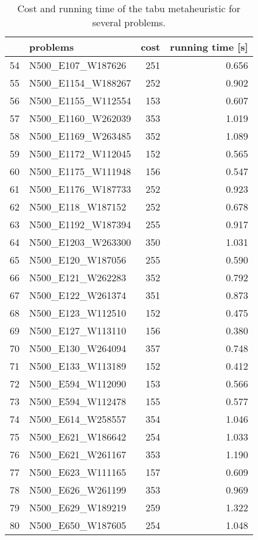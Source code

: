 \begin{table}[H]
\centering
\begin{tabular}{llrr}
\toprule
{} &            problems &  cost &  running time [s] \\
\midrule
54 &   N500\_E107\_W187626 &   251 &             0.656 \\
55 &  N500\_E1154\_W188267 &   252 &             0.902 \\
56 &  N500\_E1155\_W112554 &   153 &             0.607 \\
57 &  N500\_E1160\_W262039 &   353 &             1.019 \\
58 &  N500\_E1169\_W263485 &   352 &             1.089 \\
59 &  N500\_E1172\_W112045 &   152 &             0.565 \\
60 &  N500\_E1175\_W111948 &   156 &             0.547 \\
61 &  N500\_E1176\_W187733 &   252 &             0.923 \\
62 &   N500\_E118\_W187152 &   252 &             0.678 \\
63 &  N500\_E1192\_W187394 &   255 &             0.917 \\
64 &  N500\_E1203\_W263300 &   350 &             1.031 \\
65 &   N500\_E120\_W187056 &   255 &             0.590 \\
66 &   N500\_E121\_W262283 &   352 &             0.792 \\
67 &   N500\_E122\_W261374 &   351 &             0.873 \\
68 &   N500\_E123\_W112510 &   152 &             0.475 \\
69 &   N500\_E127\_W113110 &   156 &             0.380 \\
70 &   N500\_E130\_W264094 &   357 &             0.748 \\
71 &   N500\_E133\_W113189 &   152 &             0.412 \\
72 &   N500\_E594\_W112090 &   153 &             0.566 \\
73 &   N500\_E594\_W112478 &   155 &             0.577 \\
74 &   N500\_E614\_W258557 &   354 &             1.046 \\
75 &   N500\_E621\_W186642 &   254 &             1.033 \\
76 &   N500\_E621\_W261167 &   353 &             1.190 \\
77 &   N500\_E623\_W111165 &   157 &             0.609 \\
78 &   N500\_E626\_W261199 &   353 &             0.969 \\
79 &   N500\_E629\_W189219 &   259 &             1.322 \\
80 &   N500\_E650\_W187605 &   254 &             1.048 \\
\bottomrule
\end{tabular}
\caption{Cost and running time of the tabu metaheuristic for several problems.}
\label{table:tabu-medium-results-III}
\end{table}

